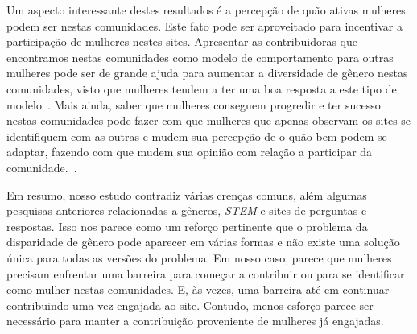 
Um aspecto interessante destes resultados é a percepção de quão ativas mulheres podem ser nestas comunidades. Este fato pode ser aproveitado para incentivar a participação de mulheres nestes sites. Apresentar as contribuidoras que encontramos nestas comunidades como modelo de comportamento para outras mulheres pode ser de grande ajuda para aumentar a diversidade de gênero nestas comunidades, visto que mulheres tendem a ter uma boa resposta a este tipo de modelo~\cite{smith1986effect,nixon1999educational}. Mais ainda, saber que mulheres conseguem progredir e ter sucesso nestas comunidades pode fazer com que mulheres que apenas observam os sites se identifiquem com as outras e mudem sua percepção de o quão bem podem se adaptar, fazendo com que mudem sua opinião com relação a participar da comunidade.~\cite{ehrlinger2003chronic}.


Em resumo, nosso estudo contradiz várias crenças comuns, além algumas pesquisas anteriores relacionadas a gêneros, \emph{STEM} e sites de perguntas e respostas. Isso nos parece como um reforço pertinente que o problema da disparidade de gênero pode aparecer em várias formas e não existe uma solução única para todas as versões do problema. Em nosso caso, parece que mulheres precisam enfrentar uma barreira para começar a contribuir ou para se identificar como mulher nestas comunidades. E, às vezes, uma barreira até em continuar contribuindo uma vez engajada ao site. Contudo, menos esforço parece ser necessário para manter a contribuição proveniente de mulheres já engajadas.


